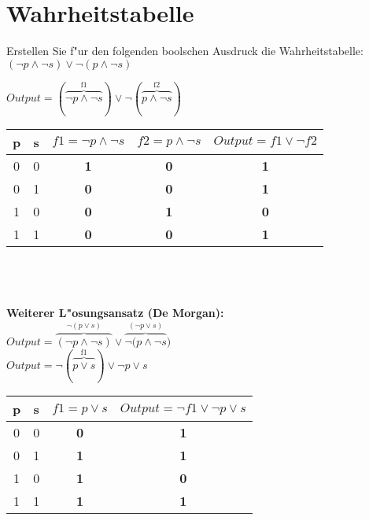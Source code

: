 \documentclass[a4paper,10pt]{article}
\begin{document}
\section{Wahrheitstabelle}
Erstellen Sie f"ur den folgenden boolschen Ausdruck die Wahrheitstabelle:\\
$(\lnot p \land \lnot s) \lor \lnot(p \land \lnot s)$ \\
	 {\color{ForestGreen}
	 
	 	$Output = (\overbrace{\lnot p \land \lnot s}^\text{f1}) \lor \lnot ( \overbrace{p \land \lnot s}^\text{f2} )$ \\
	 
		\begin{tabular}{c|c|c|c|c}
		p & s & $f1=\lnot p \land \lnot s$ & $f2=p \land \lnot s$ & $Output = f1 \lor \lnot f2$ \\
		\hline
		0 & 0 & \textbf{1} & \textbf{0} & \textbf{1}\\
		0 & 1 & \textbf{0} & \textbf{0} & \textbf{1}\\
		1 & 0 & \textbf{0} & \textbf{1} & \textbf{0}\\
		1 & 1 & \textbf{0} & \textbf{0} & \textbf{1}\\
		\end{tabular}
		\\ \\
		\\
		\textbf{Weiterer L"osungsansatz (De Morgan):} \\
		$Output = \overbrace{(\lnot p \land \lnot s)}^\text{$\lnot(p \lor s)$} \lor \overbrace{\lnot ( p \land \lnot s}^\text{$(\lnot p \lor s)$} )$ \\
		$Output = \lnot(\overbrace{p \lor s}^\text{f1}) \lor \lnot p \lor s$ \\
		
		\begin{tabular}{c|c|c|c}
		p & s & $f1=p \lor s$ & $Output = \lnot f1 \lor \lnot p \lor s$ \\
		\hline
		0 & 0 & \textbf{0} & \textbf{1}\\
		0 & 1 & \textbf{1} & \textbf{1}\\
		1 & 0 & \textbf{1} & \textbf{0}\\
		1 & 1 & \textbf{1} & \textbf{1}\\
		\end{tabular}
	 }
\end{document}

